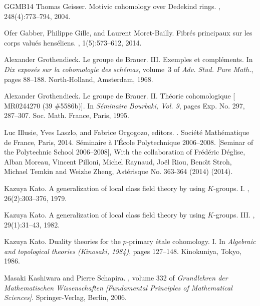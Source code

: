\documentclass{amsart}
\theoremstyle{remark}
\numberwithin{equation}{section}
\begin{document}
\begin{thebibliography}{GGMB14}
Thomas Geisser.
\newblock Motivic cohomology over {D}edekind rings.
, 248(4):773--794, 2004.

Ofer Gabber, Philippe Gille, and Laurent Moret-Bailly.
\newblock Fibr\'es principaux sur les corps valu\'es hens\'eliens.
, 1(5):573--612, 2014.

Alexander Grothendieck.
\newblock Le groupe de {B}rauer. {III}. {E}xemples et compl\'ements.
\newblock In {\em Dix expos\'es sur la cohomologie des sch\'emas}, volume~3 of
  {\em Adv. Stud. Pure Math.}, pages 88--188. North-Holland, Amsterdam, 1968.

Alexander Grothendieck.
\newblock Le groupe de {B}rauer. {II}. {T}h\'{e}orie cohomologique [
  {MR}0244270 (39 \#5586b)].
\newblock In {\em S\'{e}minaire {B}ourbaki, {V}ol. 9}, pages Exp. No. 297,
  287--307. Soc. Math. France, Paris, 1995.

Luc Illusie, Yves Laszlo, and Fabrice Orgogozo, editors.
.
\newblock Soci\'et\'e Math\'ematique de France, Paris, 2014.
\newblock S\'eminaire \`a l'\'Ecole Polytechnique 2006--2008. [Seminar of the
  Polytechnic School 2006--2008], With the collaboration of Fr\'ed\'eric
  D\'eglise, Alban Moreau, Vincent Pilloni, Michel Raynaud, Jo\"el Riou,
  Beno\^\i t Stroh, Michael Temkin and Weizhe Zheng, Ast\'erisque No. 363-364
  (2014) (2014).

Kazuya Kato.
\newblock A generalization of local class field theory by using {$K$}-groups.
  {I}.
, 26(2):303--376, 1979.

Kazuya Kato.
\newblock A generalization of local class field theory by using {$K$}-groups.
  {III}.
, 29(1):31--43, 1982.

Kazuya Kato.
\newblock Duality theories for the {$p$}-primary \'etale cohomology. {I}.
\newblock In {\em Algebraic and topological theories ({K}inosaki, 1984)}, pages
  127--148. Kinokuniya, Tokyo, 1986.

Masaki Kashiwara and Pierre Schapira.
, volume 332 of {\em Grundlehren der
  Mathematischen Wissenschaften [Fundamental Principles of Mathematical
  Sciences]}.
\newblock Springer-Verlag, Berlin, 2006.


\end{thebibliography}
\end{document}
